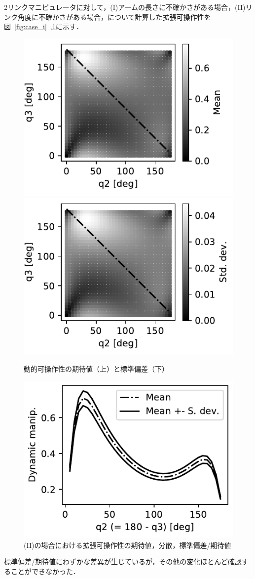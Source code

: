 \documentclass[10pt,a4j,twocolumn]{ltjsarticle}
\begin{document}
2リンクマニピュレータに対して，(I)アームの長さに不確かさがある場合，(II)リンク角度に不確かさがある場合，について計算した拡張可操作性を図~\ref{fig:case_i}~,\ref{fig:case_ii}に示す．
\begin{figure}
  \centering
  \includegraphics[width=80truemm]{./dm_mean.pdf}
  \includegraphics[width=80truemm]{./dm_std.pdf}
  \caption{動的可操作性の期待値（上）と標準偏差（下）}
  \label{fig:case_i}
  \includegraphics[width=80truemm]{./dm_dist.pdf}
  \caption{(II)の場合における拡張可操作性の期待値，分散，標準偏差/期待値}
  \label{fig:case_ii}
\end{figure}
標準偏差/期待値にわずかな差異が生じているが，その他の変化ほとんど確認することができなかった．
\end{document}
